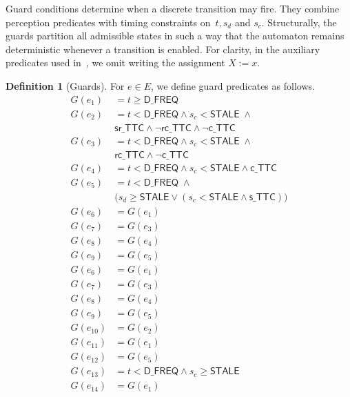 \documentclass[journal]{IEEEtran}
\theoremstyle{definition}
\newtheorem{definition}{Definition}
\theoremstyle{property}
\newcommand{\thr}[1]{\mathsf{#1}}
\newcommand{\validD}{\mathsf{valid\_d}}
\newcommand{\validC}{\mathsf{valid\_c}}
\newcommand{\sd}{\mathsf{s\_TTC}}
\newcommand{\srd}{\mathsf{sr\_TTC}}
\newcommand{\rcd}{\mathsf{rc\_TTC}}
\newcommand{\cd}{\mathsf{c\_TTC}}
\begin{document}
Guard conditions determine when a discrete transition may fire. They combine perception predicates with timing constraints on~$t, s_d$ and $s_c$. 
Structurally, the guards partition all admissible states in such a way that the automaton remains deterministic whenever a transition is enabled.
For clarity, in the auxiliary predicates used in~, we omit writing the assignment $X := x$. 
\begin{definition}[Guards]\label{def:app_guards}
For $e \in E$, we define guard predicates as follows. 
\[
\begin{aligned}
G(e_1) &= t \ge \thr{D\_FREQ} \\
G(e_2)  &= t < \thr{D\_FREQ} \land s_c < \thr{STALE} \; \land \\
&\srd \land \neg \rcd \land \neg \cd \\
G(e_3)  &= t < \thr{D\_FREQ} \land s_c < \thr{STALE} \; \land  \\
&\rcd  \land \neg \cd \\
G(e_4)  &= t < \thr{D\_FREQ} \land s_c < \thr{STALE} \land \cd \\
G(e_{5}) &= t < \thr{D\_FREQ} \; \land \\ 
&\big(s_d \geq \thr{STALE} \lor (s_c < \thr{STALE} \land \sd)\big)  \\
G(e_{6}) &= G(e_1) \\
G(e_{7}) &= G(e_3) \\
G(e_{8}) &= G(e_4) \\
G(e_{9}) &= G(e_5) \\
G(e_{6}) &= G(e_1) \\
G(e_{7}) &= G(e_3) \\
G(e_{8}) &= G(e_4) \\
G(e_{9}) &= G(e_5) \\
G(e_{10}) &= G(e_2) \\
G(e_{11}) &= G(e_1) \\
G(e_{12}) &= G(e_5)\\
G(e_{13}) &= t < \thr{D\_FREQ} \land s_c \geq \thr{STALE} \\
G(e_{14}) &= G(e_1) 
\end{aligned}
\]
\[
\begin{aligned}
\end{aligned}
\]
\end{definition}
\end{document}
